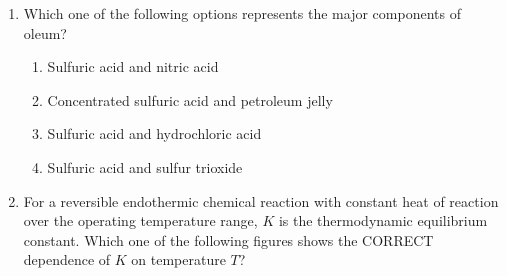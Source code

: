 \documentclass[journal,12pt,onecolumn]{IEEEtran}
\theoremstyle{remark}
\begin{document}
\begin{enumerate}
    \item Which one of the following options represents the major components of oleum?
    
\hfill{}
\begin{enumerate}
    \item Sulfuric acid and nitric acid
    \item Concentrated sulfuric acid and petroleum jelly
    \item Sulfuric acid and hydrochloric acid
    \item Sulfuric acid and sulfur trioxide
\end{enumerate}
\newpage
    \item For a reversible endothermic chemical reaction with constant heat of reaction over the operating temperature range, $K$ is the thermodynamic equilibrium constant. Which one of the following figures shows the CORRECT dependence of $K$ on temperature $T$?
    

\end{enumerate}
\end{document}
